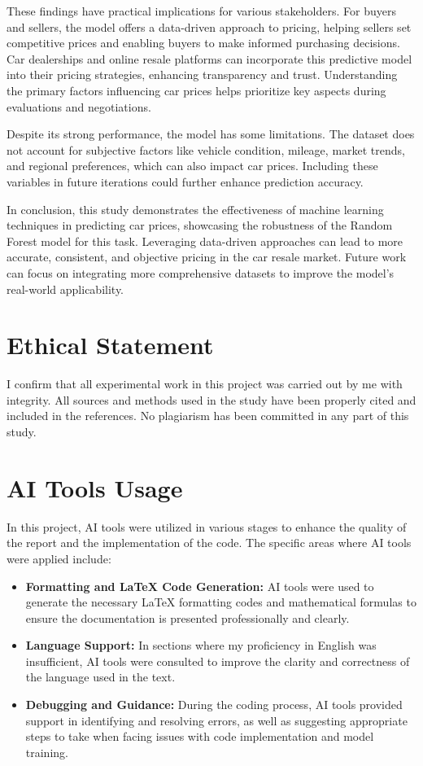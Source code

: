 \documentclass[journal]{IEEEtran}
\begin{document}
These findings have practical implications for various stakeholders. For buyers and sellers, the model offers a data-driven approach to pricing, helping sellers set competitive prices and enabling buyers to make informed purchasing decisions. Car dealerships and online resale platforms can incorporate this predictive model into their pricing strategies, enhancing transparency and trust. Understanding the primary factors influencing car prices helps prioritize key aspects during evaluations and negotiations.

Despite its strong performance, the model has some limitations. The dataset does not account for subjective factors like vehicle condition, mileage, market trends, and regional preferences, which can also impact car prices. Including these variables in future iterations could further enhance prediction accuracy.

In conclusion, this study demonstrates the effectiveness of machine learning techniques in predicting car prices, showcasing the robustness of the Random Forest model for this task. Leveraging data-driven approaches can lead to more accurate, consistent, and objective pricing in the car resale market. Future work can focus on integrating more comprehensive datasets to improve the model’s real-world applicability.
\section{Ethical Statement}
I confirm that all experimental work in this project was carried out by me with integrity. All sources and methods used in the study have been properly cited and included in the references. No plagiarism has been committed in any part of this study.
\section{AI Tools Usage}

In this project, AI tools were utilized in various stages to enhance the quality of the report and the implementation of the code. The specific areas where AI tools were applied include:

\begin{itemize}
    \item \textbf{Formatting and LaTeX Code Generation:} AI tools were used to generate the necessary LaTeX formatting codes and mathematical formulas to ensure the documentation is presented professionally and clearly.
    
    \item \textbf{Language Support:} In sections where my proficiency in English was insufficient, AI tools were consulted to improve the clarity and correctness of the language used in the text.
    
    \item \textbf{Debugging and Guidance:} During the coding process, AI tools provided support in identifying and resolving errors, as well as suggesting appropriate steps to take when facing issues with code implementation and model training.
\end{itemize}
\end{document}

